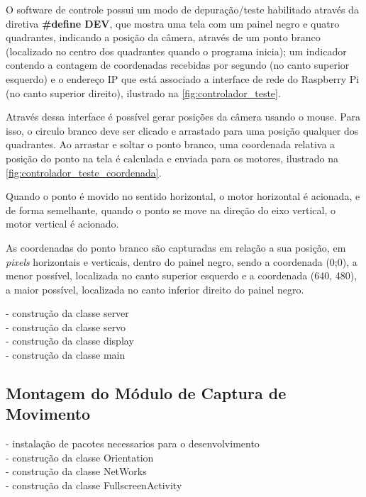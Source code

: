 O software de controle possui um modo de depuração/teste habilitado através da diretiva \textbf{\#define DEV}, que mostra uma tela com um painel negro e quatro quadrantes, indicando a posição da câmera, através de um ponto branco (localizado no centro dos quadrantes quando o programa inicia); um indicador contendo a contagem de coordenadas recebidas por segundo (no canto superior esquerdo) e o endereço IP que está associado a interface de rede do Raspberry Pi (no canto superior direito), ilustrado na \autoref{fig:controlador_teste}. \par
Através dessa interface é possível gerar posições da câmera usando o mouse. Para isso, o circulo branco deve ser clicado e arrastado para uma posição qualquer dos quadrantes. Ao arrastar e soltar o ponto branco, uma coordenada relativa a posição do ponto na tela é calculada e enviada para os motores, ilustrado na \autoref{fig:controlador_teste_coordenada}.\par
Quando o ponto é movido no sentido horizontal, o motor horizontal é acionada, e de forma semelhante, quando o ponto se move na direção do eixo vertical, o motor vertical é acionado.\par
As coordenadas do ponto branco são capturadas em relação a sua posição, em \textit{pixels} horizontais e verticais, dentro do painel negro, sendo a coordenada (0;0), a menor possível, localizada no canto superior esquerdo e a coordenada (640, 480), a maior possível, localizada no canto inferior direito do painel negro.


- construção da classe server\\
- construção da classe servo\\
- construção da classe display\\
- construção da classe main\\

\subsection{Montagem do Módulo de Captura de Movimento}
\label{subsec:assemmodcapmov}

- instalação de pacotes necessarios para o desenvolvimento\\
- construção da classe Orientation\\
- construção da classe NetWorks\\
- construção da classe FullscreenActivity\\
